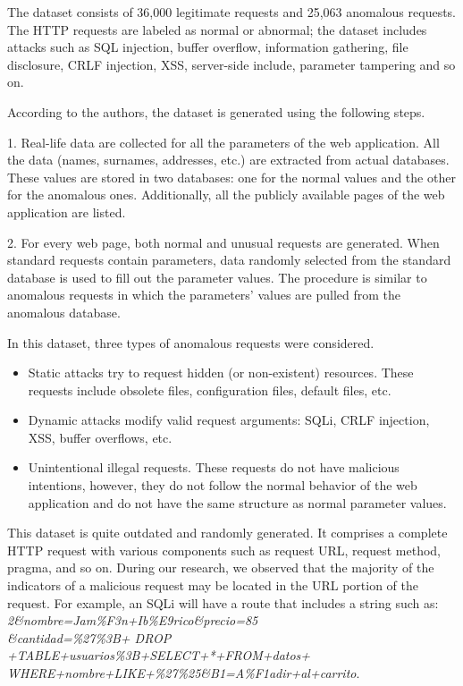 The dataset consists of 36,000 legitimate requests and 25,063 anomalous requests. The HTTP requests are labeled as normal or abnormal; the dataset includes attacks such as SQL injection, buffer overflow, information gathering, file disclosure, CRLF injection, XSS, server-side include, parameter tampering and so on. 

According to the authors, the dataset is generated using the following steps.

1.	Real-life data are collected for all the parameters of the web application. All the data (names, surnames, addresses, etc.) are extracted from actual databases. These values are stored in two databases: one for the normal values and the other for the anomalous ones. Additionally, all the publicly available pages of the web application are listed. 

2.	For every web page, both normal and unusual requests are generated. When standard requests contain parameters, data randomly selected from the standard database is used to fill out the parameter values. The procedure is similar to anomalous requests in which the parameters' values are pulled from the anomalous database.  

In this dataset, three types of anomalous requests were considered. 
\begin{itemize}
	\item Static attacks try to request hidden (or non-existent) resources. These requests include obsolete files, configuration files, default files, etc. 
	\item Dynamic attacks modify valid request arguments: SQLi, CRLF injection, XSS, buffer overflows, etc.
	\item Unintentional illegal requests. These requests do not have malicious intentions, however, they do not follow the normal behavior of the web application and do not have the same structure as normal parameter values.
\end{itemize}

This dataset is quite outdated and randomly generated. It comprises a complete HTTP request with various components such as request URL, request method, pragma, and so on. During our research, we observed that the majority of the indicators of a malicious request may be located in the URL portion of the request. For example, an SQLi will have a route that includes a string such as: \textit{2\&nombre=Jam\%F3n+Ib\%E9rico\&precio=85 \\ \&cantidad=\%27\%3B+  DROP +TABLE+usuarios\%3B+SELECT+*+FROM+datos+ \\ WHERE+nombre+LIKE+\%27\%25\&B1=A\%F1adir+al+carrito}.

